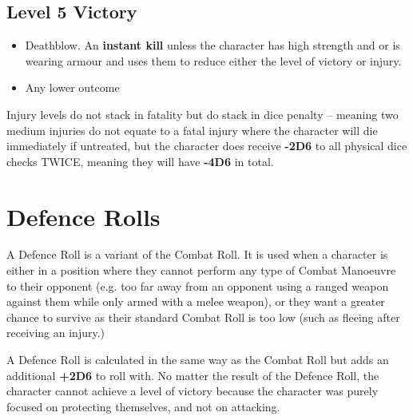 \subsection{Level 5 Victory} \label{subsec:level_5_victory}

\begin{itemize}
    \item Deathblow. An \textbf{instant kill} unless the character has high strength and or is wearing armour and uses them to reduce either the level of victory or injury.
    \item Any lower outcome
\end{itemize}

Injury levels do not stack in fatality but do stack in dice penalty – meaning two medium injuries do not equate to a fatal injury where the character will die immediately if untreated, but the character does receive \textbf{-2D6} to all physical dice checks TWICE, meaning they will have \textbf{-4D6} in total.

\section{Defence Rolls} \label{sec:defence_rolls}

A Defence Roll is a variant of the Combat Roll. It is used when a character is either in a position where they cannot perform any type of Combat Manoeuvre to their opponent (e.g. too far away from an opponent using a ranged weapon against them while only armed with a melee weapon), or they want a greater chance to survive as their standard Combat Roll is too low (such as fleeing after receiving an injury.)

A Defence Roll is calculated in the same way as the Combat Roll but adds an additional \textbf{+2D6} to roll with. No matter the result of the Defence Roll, the character cannot achieve a level of victory because the character was purely focused on protecting themselves, and not on attacking.
